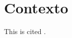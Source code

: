 \section{Contexto}\label{section:context}

\lipsum[1]

This is cited \parencite{einstein,dirac,ctan,knuth-acp,knuth-fa,knuthwebsite}.
